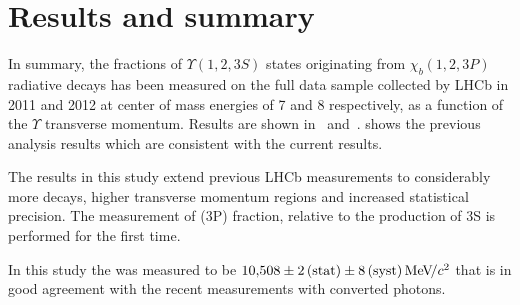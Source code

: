 \section{Results and summary}
\label{sec:results}

In summary, the fractions of $\Upsilon(1,2,3S)$ states originating from $\chi_b(1,2,3P)$ 
radiative decays has been measured on the full data sample collected by LHCb in 2011 and 2012 
at center of mass energies of 7 and 8 \tev respectively, as a function of the $\Upsilon$ 
transverse momentum. Results are shown in~
and~.
 shows the previous analysis results which
are consistent with the current results.






The results in this study extend previous LHCb measurements to considerably
more decays, higher transverse momentum regions and increased statistical
precision. The measurement of \chib(3P) fraction, relative to the production
of \Y3S  is performed for the first time.

In this study the \chiboneThreeP was measured to be $10{,}508 \pm 2\mathrm{\,(stat)} \pm 8\mathrm{\,(syst)} {\mathrm{\,Me\kern -0.1em V\!/}c^2}$ that
is in good agreement with the recent \lhcb measurements with converted photons.


